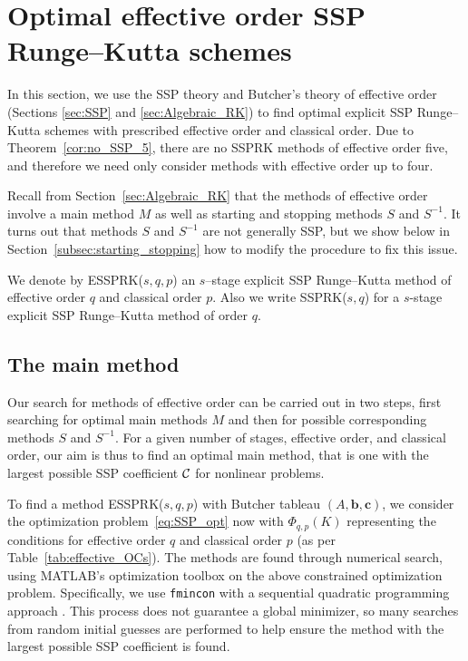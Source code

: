 \section{Optimal effective order SSP Runge--Kutta schemes}\label{sec:optimal_ESSPRK}
In this section, we use the SSP theory and Butcher's theory of effective
order (Sections \ref{sec:SSP} and \ref{sec:Algebraic_RK}) to find
optimal explicit SSP Runge--Kutta schemes with prescribed effective
order and classical order.
Due to Theorem~\ref{cor:no_SSP_5}, there are no SSPRK methods of
effective order five, and therefore we need only consider methods with
effective order up to four.

Recall from Section~\ref{sec:Algebraic_RK} that the methods of
effective order involve a main method $M$ as well as starting and
stopping methods $S$ and $S^{-1}$.
It turns out that methods $S$ and $S^{-1}$ are not generally SSP, but
we show below in Section~\ref{subsec:starting_stopping} how to modify
the procedure to fix this issue.

We denote by ESSPRK($s,q,p$) an $s$--stage explicit SSP Runge--Kutta 
method of effective order $q$ and classical order $p$.
Also we write SSPRK($s,q$) for a  $s$-stage explicit SSP Runge--Kutta 
method of order $q$.

\subsection{The main method}\label{subsec:main_method}

Our search for methods of effective order can be carried out in two
steps, first searching for optimal main methods $M$ and then for
possible corresponding methods $S$ and $S^{-1}$.
For a given number of stages, effective order, and classical order,
our aim is thus to find an optimal main method, that is one with the 
largest possible SSP coefficient $\mathcal{C}$ for nonlinear problems.

To find a method ESSPRK($s,q,p$) with Butcher tableau $(A, \bm{b},
\bm{c})$, we consider the optimization problem~\eqref{eq:SSP_opt} 
now with $\Phi_{q,p}(K)$ representing the conditions for effective order
$q$ and classical order $p$ (as per Table~\ref{tab:effective_OCs}).
The methods are found through numerical search, using 
\textsc{MATLAB}'s optimization toolbox on the above constrained 
optimization problem. 
Specifically, we use \texttt{fmincon} with a sequential quadratic 
programming approach \cite{Ketcheson2008, Ketcheson/Macdonald/Gottlieb:2009}.
This process does not guarantee a global minimizer, so many searches 
from random initial guesses are performed to help ensure the method with
the largest possible SSP coefficient is found.

